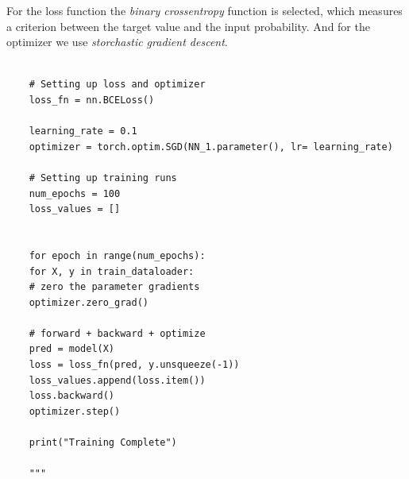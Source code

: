 For the loss function the \textit{binary crossentropy} function is selected, which measures a criterion between the target value and the input probability. And for the optimizer we use \textit{storchastic gradient descent}.\\



\begin{lstlisting}[language=iPython, caption={}]
	
	# Setting up loss and optimizer
	loss_fn = nn.BCELoss()
	
	learning_rate = 0.1
	optimizer = torch.optim.SGD(NN_1.parameter(), lr= learning_rate)
	
	# Setting up training runs
	num_epochs = 100
	loss_values = []
	
	
	for epoch in range(num_epochs):
	for X, y in train_dataloader:
	# zero the parameter gradients
	optimizer.zero_grad()
	
	# forward + backward + optimize
	pred = model(X)
	loss = loss_fn(pred, y.unsqueeze(-1))
	loss_values.append(loss.item())
	loss.backward()
	optimizer.step()
	
	print("Training Complete")
	
	"""
	
	
\end{lstlisting}
